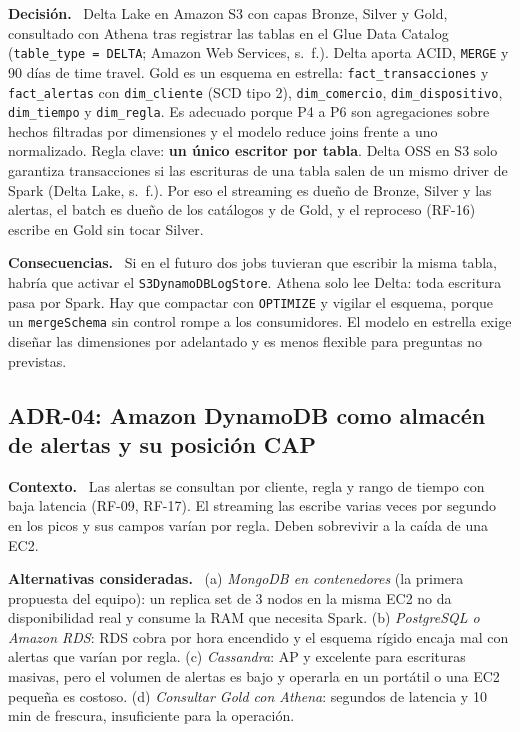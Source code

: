 \documentclass[12pt,letterpaper]{article}
\newcommand{\code}[1]{{\small\texttt{#1}}}
\newcommand{\adrpart}[1]{\textbf{#1.}~}
\begin{document}
\adrpart{Decisión} Delta Lake en Amazon S3 con capas Bronze, Silver y Gold, consultado con Athena tras registrar las tablas en el Glue Data Catalog (\code{table\_type = DELTA}; Amazon Web Services, s.~f.). Delta aporta ACID, \code{MERGE} y 90 días de time travel. Gold es un esquema en estrella: \code{fact\_transacciones} y \code{fact\_alertas} con \code{dim\_cliente} (SCD tipo 2), \code{dim\_comercio}, \code{dim\_dispositivo}, \code{dim\_tiempo} y \code{dim\_regla}. Es adecuado porque P4 a P6 son agregaciones sobre hechos filtradas por dimensiones y el modelo reduce joins frente a uno normalizado. Regla clave: \textbf{un único escritor por tabla}. Delta OSS en S3 solo garantiza transacciones si las escrituras de una tabla salen de un mismo driver de Spark (Delta Lake, s.~f.). Por eso el streaming es dueño de Bronze, Silver y las alertas, el batch es dueño de los catálogos y de Gold, y el reproceso (RF-16) escribe en Gold sin tocar Silver.

\adrpart{Consecuencias} Si en el futuro dos jobs tuvieran que escribir la misma tabla, habría que activar el \code{S3DynamoDBLogStore}. Athena solo lee Delta: toda escritura pasa por Spark. Hay que compactar con \code{OPTIMIZE} y vigilar el esquema, porque un \code{mergeSchema} sin control rompe a los consumidores. El modelo en estrella exige diseñar las dimensiones por adelantado y es menos flexible para preguntas no previstas.

\subsection*{ADR-04: Amazon DynamoDB como almacén de alertas y su posición CAP}

\adrpart{Contexto} Las alertas se consultan por cliente, regla y rango de tiempo con baja latencia (RF-09, RF-17). El streaming las escribe varias veces por segundo en los picos y sus campos varían por regla. Deben sobrevivir a la caída de una EC2.

\adrpart{Alternativas consideradas} (a) \emph{MongoDB en contenedores} (la primera propuesta del equipo): un replica set de 3 nodos en la misma EC2 no da disponibilidad real y consume la RAM que necesita Spark. (b) \emph{PostgreSQL o Amazon RDS}: RDS cobra por hora encendido y el esquema rígido encaja mal con alertas que varían por regla. (c) \emph{Cassandra}: AP y excelente para escrituras masivas, pero el volumen de alertas es bajo y operarla en un portátil o una EC2 pequeña es costoso. (d) \emph{Consultar Gold con Athena}: segundos de latencia y 10 min de frescura, insuficiente para la operación.
\end{document}
